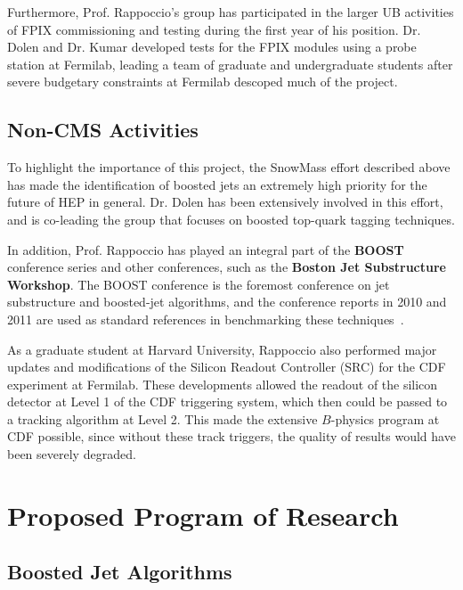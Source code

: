 \documentclass[12pt]{proposalnsf}
\begin{document}
Furthermore, Prof. Rappoccio's group has participated in the larger UB
activities of FPIX commissioning and testing during the first year of
his position. Dr. Dolen and Dr. Kumar developed tests for the FPIX
modules using a probe station at Fermilab, leading a team of graduate
and undergraduate students after severe budgetary constraints at
Fermilab descoped much of the project. 


\subsection{Non-CMS Activities}
To highlight the importance of this project, the SnowMass effort
described above has made the identification of boosted jets an
extremely high priority for the future of HEP in general. Dr. Dolen
has been extensively involved in this effort, and is co-leading the
group that focuses on boosted top-quark tagging techniques. 

In addition, Prof. Rappoccio has played an integral part of the {\bf BOOST}
conference series and other conferences, such as the {\bf Boston Jet
  Substructure Workshop}. The BOOST conference is the foremost
conference on jet substructure and boosted-jet algorithms, and the
conference reports in 2010 and 2011 are used as standard references in
benchmarking these techniques~\cite{boost2010,boost2011}.


As a graduate student at Harvard University, Rappoccio also performed
major updates and modifications of the Silicon Readout Controller
(SRC) for the CDF experiment at Fermilab. These developments allowed
the readout of the silicon detector at Level 1 of the CDF triggering
system, which then could be passed to a tracking algorithm at Level
2. This made the extensive $B$-physics program at CDF possible, since
without these track triggers, the quality of results would have been
severely degraded. 


\clearpage




\section{Proposed Program of Research}

\subsection{Boosted Jet Algorithms}
\label{sec:boostedjets}
\end{document}
